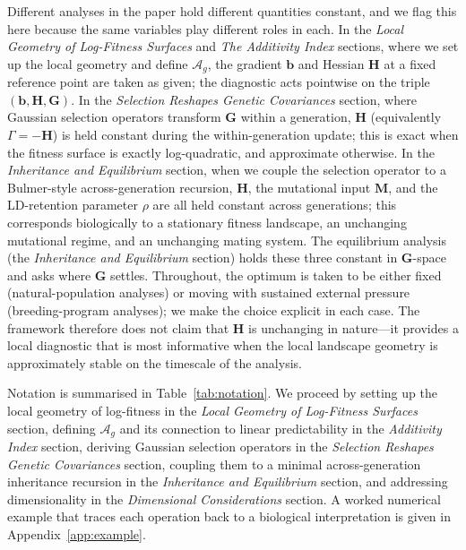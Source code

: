 \documentclass[9pt,twocolumn,twoside,lineno]{gsajnl}
\newcommand{\vect}[1]{\boldsymbol{#1}}
\newcommand{\mat}[1]{\mathbf{#1}}
\newcommand{\Ag}{\ensuremath{\mathcal{A}_{g}}\xspace}
\begin{document}
Different analyses in the paper hold different quantities constant, and we flag this here because the same variables play different roles in each. In the \textit{Local Geometry of Log-Fitness Surfaces} and \textit{The Additivity Index} sections, where we set up the local geometry and define $\Ag$, the gradient $\vect{b}$ and Hessian $\mat{H}$ at a fixed reference point are taken as given; the diagnostic acts pointwise on the triple $(\vect{b}, \mat{H}, \mat{G})$. In the \textit{Selection Reshapes Genetic Covariances} section, where Gaussian selection operators transform $\mat{G}$ within a generation, $\mat{H}$ (equivalently $\Gamma = -\mat{H}$) is held constant during the within-generation update; this is exact when the fitness surface is exactly log-quadratic, and approximate otherwise. In the \textit{Inheritance and Equilibrium} section, when we couple the selection operator to a Bulmer-style across-generation recursion, $\mat{H}$, the mutational input $\mat{M}$, and the LD-retention parameter $\rho$ are all held constant across generations; this corresponds biologically to a stationary fitness landscape, an unchanging mutational regime, and an unchanging mating system. The equilibrium analysis (the \textit{Inheritance and Equilibrium} section) holds these three constant in $\mat{G}$-space and asks where $\mat{G}$ settles. Throughout, the optimum is taken to be either fixed (natural-population analyses) or moving with sustained external pressure (breeding-program analyses); we make the choice explicit in each case. The framework therefore does not claim that $\mat{H}$ is unchanging in nature---it provides a local diagnostic that is most informative when the local landscape geometry is approximately stable on the timescale of the analysis.

Notation is summarised in Table~\ref{tab:notation}. We proceed by setting up the local geometry of log-fitness in the \textit{Local Geometry of Log-Fitness Surfaces} section, defining \Ag and its connection to linear predictability in the \textit{Additivity Index} section, deriving Gaussian selection operators in the \textit{Selection Reshapes Genetic Covariances} section, coupling them to a minimal across-generation inheritance recursion in the \textit{Inheritance and Equilibrium} section, and addressing dimensionality in the \textit{Dimensional Considerations} section. A worked numerical example that traces each operation back to a biological interpretation is given in Appendix~\ref{app:example}.

\end{document}

